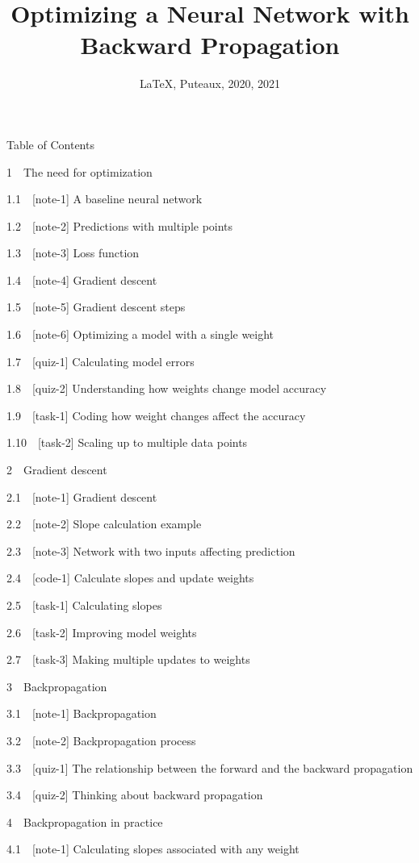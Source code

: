 \documentclass[11pt, twoside]{article}
\date{\LaTeX, Puteaux, 2020, 2021}
\title{Optimizing a Neural Network with Backward Propagation}
\begin{document}
    
    \maketitle
    
    

    
    Table of Contents{}

{{1~~}The need for optimization}

{{1.1~~}{[}note-1{]} A baseline neural network}

{{1.2~~}{[}note-2{]} Predictions with multiple points}

{{1.3~~}{[}note-3{]} Loss function}

{{1.4~~}{[}note-4{]} Gradient descent}

{{1.5~~}{[}note-5{]} Gradient descent steps}

{{1.6~~}{[}note-6{]} Optimizing a model with a single weight}

{{1.7~~}{[}quiz-1{]} Calculating model errors}

{{1.8~~}{[}quiz-2{]} Understanding how weights change model accuracy}

{{1.9~~}{[}task-1{]} Coding how weight changes affect the accuracy}

{{1.10~~}{[}task-2{]} Scaling up to multiple data points}

{{2~~}Gradient descent}

{{2.1~~}{[}note-1{]} Gradient descent}

{{2.2~~}{[}note-2{]} Slope calculation example}

{{2.3~~}{[}note-3{]} Network with two inputs affecting prediction}

{{2.4~~}{[}code-1{]} Calculate slopes and update weights}

{{2.5~~}{[}task-1{]} Calculating slopes}

{{2.6~~}{[}task-2{]} Improving model weights}

{{2.7~~}{[}task-3{]} Making multiple updates to weights}

{{3~~}Backpropagation}

{{3.1~~}{[}note-1{]} Backpropagation}

{{3.2~~}{[}note-2{]} Backpropagation process}

{{3.3~~}{[}quiz-1{]} The relationship between the forward and the
backward propagation}

{{3.4~~}{[}quiz-2{]} Thinking about backward propagation}

{{4~~}Backpropagation in practice}

{{4.1~~}{[}note-1{]} Calculating slopes associated with any weight}
\end{document}
